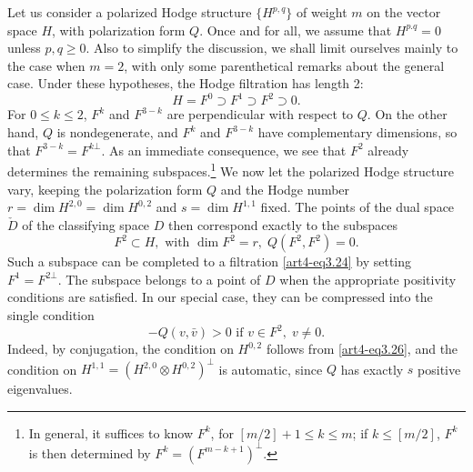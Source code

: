 Let us consider a polarized Hodge structure $\{H^{p,q}\}$ of weight $m$ on the vector space $H$, with polarization form $Q$. Once and for all, we assume that $H^{p.q} =0$ unless $p, q \geqslant 0$. Also to simplify the discussion, we shall limit ourselves mainly to the case when $m =2$, with only some parenthetical remarks about the general case. Under these hypotheses, the Hodge filtration has length 2:
\begin{equation}
H = F^0 \supset F^1 \supset F^2 \supset 0. \label{art4-eq3.24}
\end{equation}
For $0 \leqslant k \leqslant 2$, $F^k$ and $F^{3-k}$ are perpendicular with respect to $Q$. On the other hand, $Q$ is nondegenerate, and $F^k$ and $F^{3-k}$ have complementary dimensions, so that $F^{3-k} = F^{k \bot}$. As an immediate consequence, we see that $F^2$ already determines the remaining subspaces.\footnote[13]{In general, it suffices to know $F^k$, for $[m/2] + 1 \leqslant k \leqslant m$; if $k \leqslant [m/2]$, $F^k$ is then determined by $F^k = (F^{m-k+1})^\bot$.} We now let the polarized Hodge structure vary, keeping the polarization form $Q$ and the Hodge number $r = \dim H^{2,0} = \dim H^{0,2}$ and $s = \dim H^{1,1}$ fixed. The points of the dual space $\check{D}$ of the classifying space $D$ then correspond exactly to the subspaces
\begin{equation}
F^2 \subset H, \text{ with } \dim F^2 = r , \; Q (F^2, F^2) = 0. 
\label{art4-eq3.25}
\end{equation}
Such a subspace can be completed to a filtration  \eqref{art4-eq3.24} by setting $F^1 = F^{2\bot}$. The subspace belongs to a point of $D$ when the appropriate positivity conditions are satisfied. In our special case, they can be compressed into the single condition
\begin{equation}
- Q (v, \bar{v}) > 0 \text{ if } v \in F^2, \; v \neq 0.
\label{art4-eq3.26}
\end{equation}
Indeed, by conjugation, the condition on $H^{0,2}$ follows from \eqref{art4-eq3.26}, and the condition on $H^{1,1} = (H^{2,0} \otimes H^{0,2})^\bot$ is automatic, since $Q$ has exactly $s$ positive eigenvalues.
 
